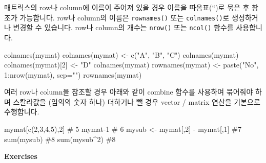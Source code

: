 \documentclass[
  a4paper,
]{book}
\newenvironment{Shaded}{\begin{snugshade}}{\end{snugshade}}
\newcommand{\AttributeTok}[1]{\textcolor[rgb]{0.40,0.45,0.13}{#1}}
\newcommand{\CommentTok}[1]{\textcolor[rgb]{0.37,0.37,0.37}{#1}}
\newcommand{\DecValTok}[1]{\textcolor[rgb]{0.68,0.00,0.00}{#1}}
\newcommand{\FunctionTok}[1]{\textcolor[rgb]{0.28,0.35,0.67}{#1}}
\newcommand{\NormalTok}[1]{\textcolor[rgb]{0.00,0.23,0.31}{#1}}
\newcommand{\OtherTok}[1]{\textcolor[rgb]{0.00,0.23,0.31}{#1}}
\newcommand{\SpecialCharTok}[1]{\textcolor[rgb]{0.37,0.37,0.37}{#1}}
\newcommand{\StringTok}[1]{\textcolor[rgb]{0.13,0.47,0.30}{#1}}
\begin{document}
매트릭스의 row나 column에 이름이 주어져 있을 경우 이름을 따옴표(``)로
묶은 후 참조가 가능합니다. row나 column의 이름은 \texttt{rownames()}
또는 \texttt{colnames()}로 생성하거나 변경할 수 있습니다. row나 column의
개수는 \texttt{nrow()} 또는 \texttt{ncol()} 함수를 사용합니다.

\begin{Shaded}
\begin{Highlighting}[]
\FunctionTok{colnames}\NormalTok{(mymat)}
\FunctionTok{colnames}\NormalTok{(mymat) }\OtherTok{\textless{}{-}} \FunctionTok{c}\NormalTok{(}\StringTok{"A"}\NormalTok{, }\StringTok{"B"}\NormalTok{, }\StringTok{"C"}\NormalTok{)}
\FunctionTok{colnames}\NormalTok{(mymat)}
\FunctionTok{colnames}\NormalTok{(mymat)[}\DecValTok{2}\NormalTok{] }\OtherTok{\textless{}{-}} \StringTok{"D"}
\FunctionTok{colnames}\NormalTok{(mymat)}
\FunctionTok{rownames}\NormalTok{(mymat) }\OtherTok{\textless{}{-}} \FunctionTok{paste}\NormalTok{(}\StringTok{"No"}\NormalTok{, }\DecValTok{1}\SpecialCharTok{:}\FunctionTok{nrow}\NormalTok{(mymat), }\AttributeTok{sep=}\StringTok{""}\NormalTok{)}
\FunctionTok{rownames}\NormalTok{(mymat)}
\end{Highlighting}
\end{Shaded}

여러 row나 column을 참조할 경우 아래와 같이 combine 함수를 사용하여
묶어줘야 하며 스칼라값을 (임의의 숫자 하나) 더하거나 뺄 경우 vector /
matrix 연산을 기본으로 수행합니다.

\begin{Shaded}
\begin{Highlighting}[]
\NormalTok{mymat[}\FunctionTok{c}\NormalTok{(}\DecValTok{2}\NormalTok{,}\DecValTok{3}\NormalTok{,}\DecValTok{4}\NormalTok{,}\DecValTok{5}\NormalTok{),}\DecValTok{2}\NormalTok{] }\CommentTok{\# 5}
\NormalTok{mymat}\DecValTok{{-}1} \CommentTok{\# 6}
\NormalTok{mysub }\OtherTok{\textless{}{-}}\NormalTok{ mymat[,}\DecValTok{2}\NormalTok{] }\SpecialCharTok{{-}}\NormalTok{ mymat[,}\DecValTok{1}\NormalTok{] }\CommentTok{\#7}
\FunctionTok{sum}\NormalTok{(mysub) }\CommentTok{\#8}
\FunctionTok{sum}\NormalTok{(mysub}\SpecialCharTok{\^{}}\DecValTok{2}\NormalTok{) }\CommentTok{\#8}
\end{Highlighting}
\end{Shaded}

\textbf{Exercises}
\end{document}
